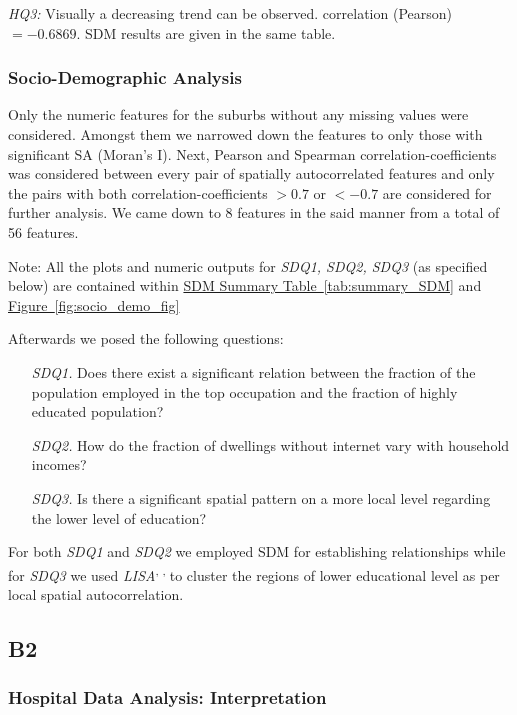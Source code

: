 \documentclass[
	a4paper, %
	10pt, %
	unnumberedsections, %
	twoside, %
]{LTJournalArticle}
\begin{document}
\textit{HQ3:} Visually a decreasing trend can be observed. correlation (Pearson)$= -0.6869$. SDM results are given in the same table.


\subsubsection{Socio-Demographic Analysis}
Only the numeric features for the suburbs without any missing values were considered. Amongst them we narrowed down the features to only those with significant SA (Moran's I). Next, Pearson and Spearman correlation-coefficients was considered between every pair of spatially autocorrelated features and only the pairs with both correlation-coefficients  $>0.7$ or $<-0.7$ are considered for further analysis. We came down to 8 features in the said manner from a total of 56 features.

Note: All the plots and numeric outputs for \textit{SDQ1, SDQ2, SDQ3} (as specified below) are contained within \hyperref[tab:summary_SDM]{SDM Summary Table~\ref{tab:summary_SDM}} and \hyperref[fig:socio_demo_fig]{Figure~\ref{fig:socio_demo_fig}}

Afterwards we posed the following questions:

\begin{enumerate}
  \item[\textit{SDQ1.}] Does there exist a significant relation between the fraction of the population employed in the top occupation and the fraction of highly educated population?
  \item[\textit{SDQ2.}] How do the fraction of dwellings without internet vary with household incomes?
  \item[\textit{SDQ3.}] Is there a significant spatial pattern on a more local level regarding the lower level of education? 
\end{enumerate}

For both \textit{SDQ1} and \textit{SDQ2} we employed SDM for establishing relationships while for \textit{SDQ3} we used \textit{LISA}\textsuperscript{\cite{Anselin1995}, \cite{darribasLab_05}, \cite{geodacenterLocalSpatial}} to cluster the regions of lower educational level as per local spatial autocorrelation.

\subsection{B2}

\subsubsection{Hospital Data Analysis: Interpretation}\leavevmode
\end{document}
